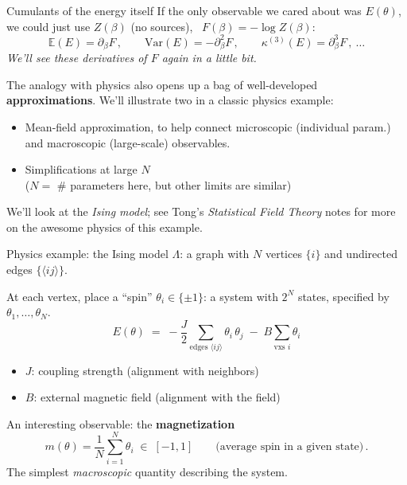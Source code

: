 \documentclass[11pt]{beamer}
\newcommand{\E}{\mathbb{E}}
\newcommand{\pd}{\partial}
\newcommand{\hl}[1]{{\color{blue!60!black}\textbf{#1}}}
\begin{document}
\begin{frame}{Cumulants of the energy itself}
  If the only observable we cared about was $E(\theta)$, we could just
  use $Z(\beta)$ (no sources), \ $F(\beta) = -\log Z(\beta)$:
  \[
    \E(E) = \pd_\beta F\,,\qquad
    \mathrm{Var}(E) = -\pd_\beta^2 F\,,\qquad
    \kappa^{(3)}(E) = \pd_\beta^3 F\,,\ \dots
  \]
  \emph{We'll see these derivatives of $F$ again in a little bit.}  \pause
  \vspace{6mm}

  The analogy with physics also opens up a bag of well-developed \hl{approximations}. \pause We'll illustrate two in a classic physics example:
  \begin{itemize}
  \item Mean-field approximation, to help connect microscopic (individual param.) and macroscopic (large-scale) observables.  \pause
  \item Simplifications at large $N$ \\ ($N=$ \# parameters here, but other limits are similar)
  \end{itemize} \pause
  We'll look at the \emph{Ising model}; see Tong's \emph{Statistical Field Theory} notes for more on the awesome physics of this example.
\end{frame}

\begin{frame}{Physics example: the Ising model}
  $\Lambda$: a graph with $N$ vertices $\{i\}$ and undirected edges
  $\{\langle ij\rangle\}$.  \pause
  \vspace{1mm}

  At each vertex, place a ``spin'' $\theta_i \in \{\pm 1\}$: a system with
  $2^N$ states, specified by $\theta_1, \dots, \theta_N$. \pause
  \[
    E(\theta) \;=\; -\frac{J}{2}\!\!\sum_{\text{edges }\langle ij\rangle}\!\!
    \theta_i\,\theta_j \;-\; B \sum_{\text{vxs } i} \theta_i
  \]
  \begin{itemize}
    \item $J$: coupling strength (alignment with neighbors)
    \item $B$: external magnetic field (alignment with the field)
  \end{itemize}  \pause
  \vspace{2mm}

  An interesting observable: the \hl{magnetization}
  \vspace{-.2cm}
  \[
    m(\theta) = \frac1N \sum_{i=1}^N \theta_i \;\in\; [-1, 1]
    \qquad \text{(average spin in a given state)}\,.
  \]
  The simplest \emph{macroscopic} quantity describing the system.
  \vspace{1mm}
\end{frame}
\end{document}
